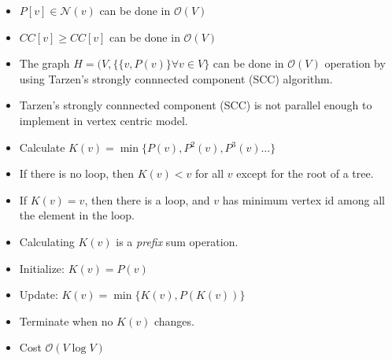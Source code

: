 \lyxframeend{}




\begin{itemize}
\item $P[v] \in \mathcal{N}(v)$ can be done in $\mathcal{O}(V)$
\item $CC[v] \geq CC[v] $  can be done in $\mathcal{O}(V)$
\item The graph $H=(V, \{\{v,P(v)\}\forall v \in V\} $ can be done in $\mathcal{O}(V)$ operation
by using Tarzen's strongly connnected component (SCC) algorithm.
\item Tarzen's strongly connnected component (SCC) is not parallel enough to implement in vertex centric model. 
\end{itemize}

\lyxframeend{}



\begin{itemize}
\item Calculate $K(v) = \min \{P(v),P{^2}(v), P{^3}(v) \ldots \} $
\end{itemize}

\begin{theorem}
\begin{itemize}
\item If there is no loop, then $K(v) < v$ for all $v$ except for the root of a tree. 
\item If $K(v)=v$, then there is a loop, and $v$ has minimum vertex id among all the element in the loop. 
\end{itemize}
\end{theorem}

\lyxframeend{}



\begin{itemize}
\item Calculating  $K(v)$ is a \emph{prefix} sum operation.
\item Initialize: $K(v) = P(v)$
\item Update: $K(v) = \min \{ K(v), P(K(v)) \}$
\item Terminate when no $K(v)$ changes. 
\end{itemize}

\begin{itemize}
\item Cost $\mathcal{O}(V \log V)$
\end{itemize}


